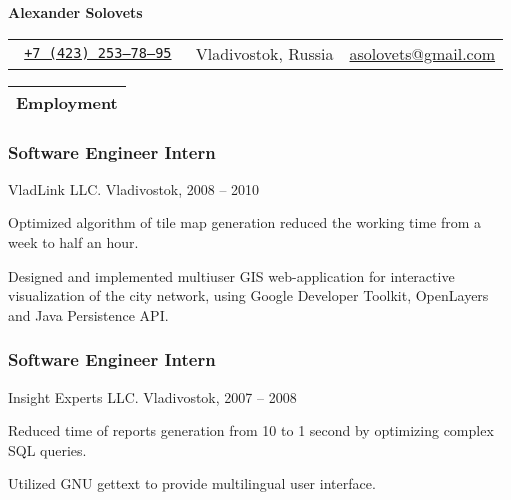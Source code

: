 \documentclass[a4paper]{article}
\def\name{Alexander Solovets}
\begin{document}
\color{dark-gray}
\sf

\begin{center}
	{\Huge \bfseries \name}
	\vskip 4pt
	\begin{tabular}{r|c|r}
		\tt
		\href{tel:+7-423-253-78-95}{+7 (423) 253--78--95} & Vladivostok, Russia & \href{mailto:asolovets@gmail.com}{asolovets@gmail.com}\\
	\end{tabular}
\end{center}

\small

	\begin{tabularx}{\textwidth}{@{}X}
		\textbf{\color{black}\large Employment}\\
		\hline
	\end{tabularx}
		\begin{multicols}{2}
			\raggedcolumns
			\subsubsection*{Software Engineer Intern}
			{\color{black}VladLink LLC. Vladivostok, 2008 -- 2010}
			\begin{items}
				\item Optimized algorithm of tile map generation reduced the working time from a week to half an hour.
				\item Designed and implemented multiuser GIS web-application for interactive visualization of the city network, using Google Developer Toolkit, OpenLayers and Java Persistence API.
			\end{items}

			\columnbreak

			\subsubsection*{Software Engineer Intern}
			{\color{black}Insight Experts LLC. Vladivostok, 2007 -- 2008}
			\begin{items}
				\item Reduced time of reports generation from 10 to 1 second by optimizing complex SQL queries.
				\item Utilized GNU gettext to provide multilingual user interface.
			\end{items}
		\end{multicols}
\end{document}
